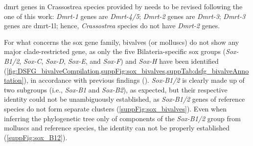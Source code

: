 \gls{dmrt} genes in Crassostrea species provided by \textbf{\cite{zeng2024genome}} needs to be revised following the one of this work: \textit{Dmrt-1} genes are \textit{Dmrt-4/5}; \textit{Dmrt-2} genes are \textit{Dmrt-3}; \textit{Dmrt-3} genes are \gls{dmrt-1l}; hence, \textit{Crassostrea} species do not have \textit{Dmrt-2} genes.

For what concerns the \gls{sox} gene family, bivalves (or molluscs) do not show any major clade-restricted gene, as only the five Bilateria-specific \gls{sox} groups (\textit{Sox-B1/2}, \textit{Sox-C}, \textit{Sox-D}, \textit{Sox-E}, and \textit{Sox-F}) and \textit{Sox-H} have been identified (\cref{fig:DSFG_bivalveCompilation,suppFig:sox_bivalves,suppTab:dsfg_bivalveAnnotation}), in accordance with previous findings (\textbf{\cite{yu2017genome,evensen2022comparative, wang2024genome}}). \textit{Sox-B1/2} is clearly made up of two subgroups (i.e., \textit{Sox-B1} and \textit{Sox-B2}), as expected, but their respective identity could not be unambiguously established, as \textit{Sox-B1/2} genes of reference species do not form separate clusters (\cref{suppFig:sox_bivalves}). Even when inferring the phylogenetic tree only of components of the \textit{Sox-B1/2} group from molluscs and reference species, the identity can not be properly established (\cref{suppFig:sox_B12}).

